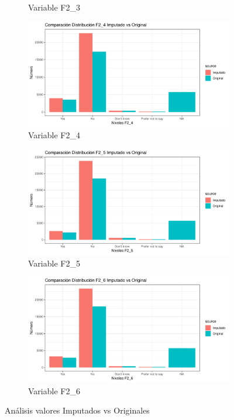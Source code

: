 \documentclass[a4paper, 11pt]{article}
\begin{document}
\begin{center}
\begin{figure}[htbp]
\begin{subfigure}[t]{0.45\linewidth}
        \caption{Variable F2\_3}
        \label{fig:Analysis_MV_F2_3}
    \end{subfigure}
    \hfill 
    \begin{subfigure}[t]{0.45\linewidth}
        \centering
        \includegraphics[width=\linewidth]{images/Analysis_MV_F2_4.pdf}
        \caption{Variable F2\_4}
        \label{fig:Analysis_MV_F2_4}
    \end{subfigure}
        \hfill 
    \begin{subfigure}[t]{0.45\linewidth}
        \centering
        \includegraphics[width=\linewidth]{images/Analysis_MV_F2_5.pdf}
        \caption{Variable F2\_5}
        \label{fig:Analysis_MV_F2_5}
    \end{subfigure}
    \hfill 
    \begin{subfigure}[t]{0.45\linewidth}
        \centering
        \includegraphics[width=\linewidth]{images/Analysis_MV_F2_6.pdf}
        \caption{Variable F2\_6}
        \label{fig:Analysis_MV_F2_6}
    \end{subfigure}
    \caption{Análisis valores Imputados vs Originales}
    \label{fig:synthetic_analysis}
\end{figure}
\end{center}
\end{document}
